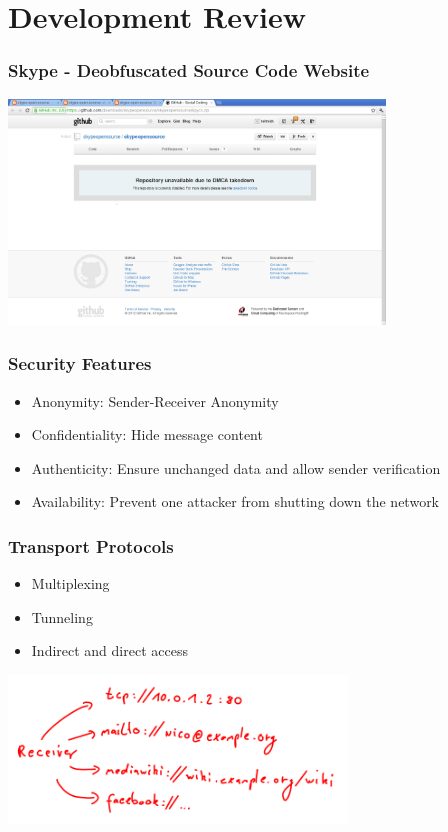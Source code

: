 \documentclass{beamer}
\begin{document}
\section{Development Review}
\frame
{
    \frametitle{Skype - Deobfuscated Source Code Website}

    \begin{center}
        \includegraphics[width=10cm]{dmca-skype.png}
    \end{center}
}

\frame
{
  \frametitle{Security Features}
  \begin{itemize}
          \item Anonymity: Sender-Receiver Anonymity
          \item Confidentiality: Hide message content
          \item Authenticity: Ensure unchanged data and allow sender verification
          \item Availability: Prevent one attacker from shutting down the network
   \end{itemize}
}

\frame
{
  \frametitle{Transport Protocols}
  \begin{itemize}
      \item Multiplexing
      \item Tunneling
      \item Indirect and direct access
  \end{itemize}
  \begin{center}
   \includegraphics[width=9cm]{../addressmultiplexing.png}
  \end{center}
}
\end{document}
